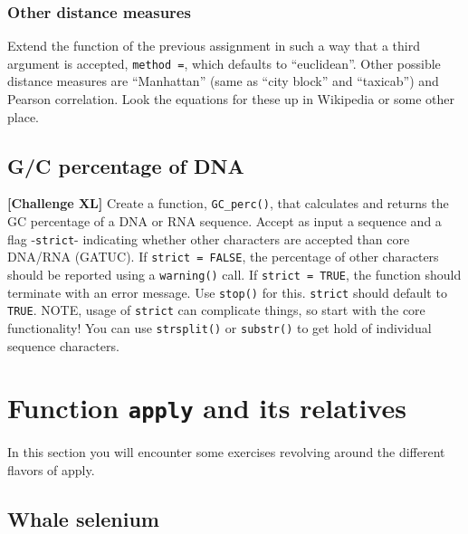 \documentclass[]{book}
\begin{document}
\hypertarget{other-distance-measures}{%
\subsubsection*{Other distance measures}\label{other-distance-measures}}

Extend the function of the previous assignment in such a way that a third argument is accepted, \texttt{method\ =}, which defaults to ``euclidean''. Other possible distance measures are ``Manhattan'' (same as ``city block'' and ``taxicab'') and Pearson correlation. Look the equations for these up in Wikipedia or some other place.

\hypertarget{gc-percentage-of-dna}{%
\subsection{G/C percentage of DNA}\label{gc-percentage-of-dna}}

\textbf{{[}Challenge XL{]}} Create a function, \texttt{GC\_perc()}, that calculates and returns the GC percentage of a DNA or RNA sequence. Accept as input a sequence and a flag -\texttt{strict}- indicating whether other characters are accepted than core DNA/RNA (GATUC). If \texttt{strict\ =\ FALSE}, the percentage of other characters should be reported using a \texttt{warning()} call. If \texttt{strict\ =\ TRUE}, the function should terminate with an error message. Use \texttt{stop()} for this. \texttt{strict} should default to \texttt{TRUE}. NOTE, usage of \texttt{strict} can complicate things, so start with the core functionality!
You can use \texttt{strsplit()} or \texttt{substr()} to get hold of individual sequence characters.

\hypertarget{function-apply-and-its-relatives}{%
\section{\texorpdfstring{Function \texttt{apply} and its relatives}{Function apply and its relatives}}\label{function-apply-and-its-relatives}}

In this section you will encounter some exercises revolving around the different flavors of apply.

\hypertarget{whale-selenium}{%
\subsection{Whale selenium}\label{whale-selenium}}
\end{document}
